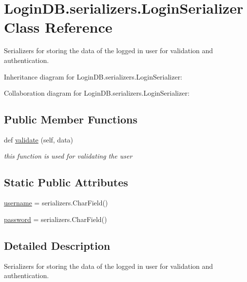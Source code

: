 \hypertarget{class_login_d_b_1_1serializers_1_1_login_serializer}{}\section{Login\+D\+B.\+serializers.\+Login\+Serializer Class Reference}
\label{class_login_d_b_1_1serializers_1_1_login_serializer}


Serializers for storing the data of the logged in user for validation and authentication.  




Inheritance diagram for Login\+D\+B.\+serializers.\+Login\+Serializer\+:


Collaboration diagram for Login\+D\+B.\+serializers.\+Login\+Serializer\+:
\subsection*{Public Member Functions}
\begin{DoxyCompactItemize}
\item 
def \hyperlink{class_login_d_b_1_1serializers_1_1_login_serializer_a0e1bcc1a6f5008b631d130a48e589def}{validate} (self, data)
\begin{DoxyCompactList}\small\item\em this function is used for validating the user \end{DoxyCompactList}\end{DoxyCompactItemize}
\subsection*{Static Public Attributes}
\begin{DoxyCompactItemize}
\item 
\hyperlink{class_login_d_b_1_1serializers_1_1_login_serializer_a67460bfa682abfd395be3a19f2ee56af}{username} = serializers.\+Char\+Field()
\item 
\hyperlink{class_login_d_b_1_1serializers_1_1_login_serializer_a244a561f5a08720e6bb5a2443594b856}{password} = serializers.\+Char\+Field()
\end{DoxyCompactItemize}


\subsection{Detailed Description}
Serializers for storing the data of the logged in user for validation and authentication. 

